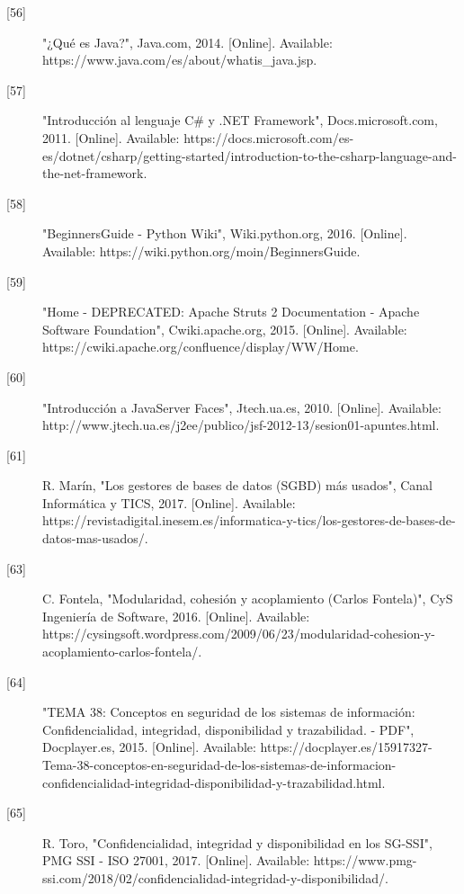 \begin{description}
		\item[\hypertarget{b56}{[56]}] "¿Qué es Java?", Java.com, 2014. [Online]. Available: https://www.java.com/es/about/whatis\_java.jsp. 
		
		\item[\hypertarget{b57}{[57]}] "Introducción al lenguaje C\# y .NET Framework", Docs.microsoft.com, 2011. [Online]. Available: https://docs.microsoft.com/es-es/dotnet/csharp/getting-started/introduction-to-the-csharp-language-and-the-net-framework.
		
		\item[\hypertarget{b58}{[58]}] "BeginnersGuide - Python Wiki", Wiki.python.org, 2016. [Online]. Available: https://wiki.python.org/moin/BeginnersGuide. 
		
		\item[\hypertarget{b59}{[59]}] "Home - DEPRECATED: Apache Struts 2 Documentation - Apache Software Foundation", Cwiki.apache.org, 2015. [Online]. Available: https://cwiki.apache.org/confluence/display/WW/Home. 
		
		\item[\hypertarget{b60}{[60]}] "Introducción a JavaServer Faces", Jtech.ua.es, 2010. [Online]. Available: http://www.jtech.ua.es/j2ee/publico/jsf-2012-13/sesion01-apuntes.html. 
		
		\item[\hypertarget{b61}{[61]}] R. Marín, "Los gestores de bases de datos (SGBD) más usados", Canal Informática y TICS, 2017. [Online]. Available: https://revistadigital.inesem.es/informatica-y-tics/los-gestores-de-bases-de-datos-mas-usados/.
		
		\item[\hypertarget{b63}{[63]}] C. Fontela, "Modularidad, cohesión y acoplamiento (Carlos Fontela)", CyS Ingeniería de Software, 2016. [Online]. Available: https://cysingsoft.wordpress.com/2009/06/23/modularidad-cohesion-y-acoplamiento-carlos-fontela/.
		
		\item[\hypertarget{b64}{[64]}] "TEMA 38: Conceptos en seguridad de los sistemas de información: Confidencialidad, integridad, disponibilidad y trazabilidad. - PDF", Docplayer.es, 2015. [Online]. Available: https://docplayer.es/15917327-Tema-38-conceptos-en-seguridad-de-los-sistemas-de-informacion-confidencialidad-integridad-disponibilidad-y-trazabilidad.html. 
		
		\item[\hypertarget{b65}{[65]}] R. Toro, "Confidencialidad, integridad y disponibilidad en los SG-SSI", PMG SSI - ISO 27001, 2017. [Online]. Available: https://www.pmg-ssi.com/2018/02/confidencialidad-integridad-y-disponibilidad/. 
		

\end{description}
